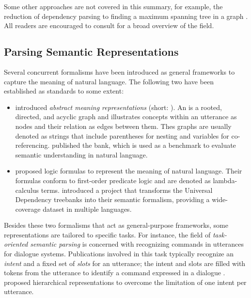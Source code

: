 \documentclass[../document.tex]{subfiles}
\begin{document}
    Some other approaches are not covered in this summary, for example, the reduction of dependency parsing to finding a maximum spanning tree in a graph \citep{mcdonald-etal-2005-non}.
    All readers are encouraged to consult \citet{nivre2010dependency} for a broad overview of the field.

    \subsection{Parsing Semantic Representations}
    Several concurrent formalisms have been introduced as general frameworks to capture the meaning of natural language.
    The following two have been established as standards to some extent:
    \begin{itemize}
        \item {} introduced \emph{abstract meaning representations} (short: ).
            An  is a rooted, directed, and acyclic graph and illustrates concepts within an utterance as nodes and their relation as edges between them.
            Thes graphs are usually denoted as strings that include parentheses for nesting and variables for co-referencing.
             published the  bank, which is used as a benchmark to evaluate semantic understanding in natural language.
        \item {} proposed logic formulas to represent the meaning of natural language.
            Their formulas conform to first-order predicate logic and are denoted as lambda-calculus terms.
             introduced a project that transforms the Universal Dependency treebanks \citep{de2021universal} into their semantic formalism, providing a wide-coverage dataset in multiple languages.
    \end{itemize}
    Besides these two formalisms that act as general-purpose frameworks, some representations are tailored to specific tasks.
    For instance, the field of \emph{task-oriented semantic parsing} is concerned with recognizing commands in utterances for dialogue systems.
    Publications involved in this task typically recognize an \emph{intent} and a fixed set of \emph{slots} for an utterance; the intent and slots are filled with tokens from the utterance to identify a command expressed in a dialogue \citep{mesnil2013investigation}.
     proposed hierarchical representations to overcome the limitation of one intent per utterance.
\end{document}
